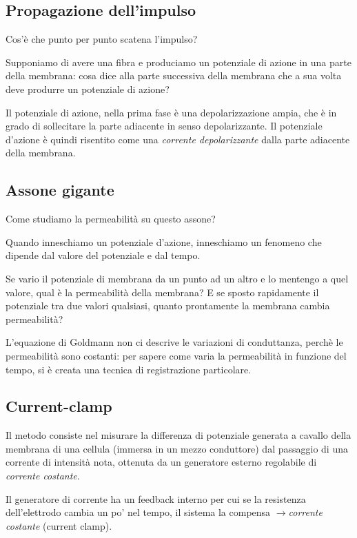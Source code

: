 \documentclass[a4paper,12pt]{article}
\newcommand{\lfreccia}{\ensuremath{\longrightarrow}}
\begin{document}
\subsection{Propagazione dell'impulso}
Cos'è che punto per punto scatena l'impulso?

Supponiamo di avere una fibra e produciamo un potenziale di azione in una parte della membrana: cosa dice alla parte successiva della membrana che a sua volta deve produrre un potenziale di azione?

Il potenziale di azione, nella prima fase è una depolarizzazione ampia, che è in grado di sollecitare la parte adiacente in senso depolarizzante. Il potenziale d'azione è quindi risentito come una \emph{corrente depolarizzante} dalla parte adiacente della membrana.

\subsection{Assone gigante}
Come studiamo la permeabilità su questo assone?

Quando inneschiamo un potenziale d'azione, inneschiamo un fenomeno che dipende dal valore del potenziale e dal tempo.

Se vario il potenziale di membrana da un punto ad un altro e lo mentengo a quel valore, qual è la permeabilità della membrana? E se sposto rapidamente il potenziale tra due valori qualsiasi, quanto prontamente la membrana cambia permeabilità?

L'equazione di Goldmann non ci descrive le variazioni di conduttanza, perchè le permeabilità sono costanti: per sapere come varia la permeabilità in funzione del tempo, si è creata una tecnica di registrazione particolare.

\subsection{Current-clamp}
Il metodo consiste nel misurare la differenza di potenziale generata a cavallo della membrana di una cellula (immersa in un mezzo conduttore) dal passaggio di una corrente di intensità nota, ottenuta da un generatore esterno regolabile di \emph{corrente costante}.

Il generatore di corrente ha un feedback interno per cui se la resistenza dell'elettrodo cambia un po' nel tempo, il sistema la compensa \lfreccia \emph{corrente costante} (current clamp).
\end{document}
